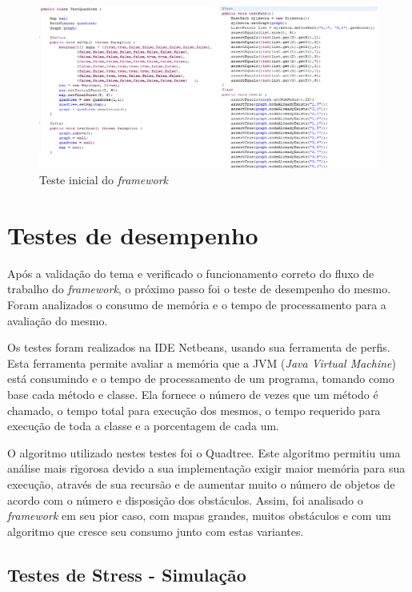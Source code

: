 \begin{figure}[h]
	\centering
	\label{fig35}
		\includegraphics[keepaspectratio=true,scale=0.6]{figuras/testeinicial.png}
	\caption{Teste inicial do \textit{framework}}
\end{figure}

\section{Testes de desempenho}

Após a validação do tema e verificado o funcionamento correto do fluxo de trabalho do \textit{framework}, o próximo passo foi o teste de desempenho do mesmo. Foram analizados o consumo de memória e o tempo de processamento para a avaliação do mesmo. 

Os testes foram realizados na IDE Netbeans, usando sua ferramenta de perfis. Esta ferramenta permite avaliar a memória que a JVM (\textit{Java Virtual Machine}) está consumindo e o tempo de processamento de um programa, tomando como base cada método e classe. Ela fornece o número de vezes que um método é chamado, o tempo total para execução dos mesmos, o tempo requerido para execução de toda a classe e a porcentagem de cada um.

O algoritmo utilizado nestes testes foi o Quadtree. Este algoritmo permitiu uma análise mais rigorosa devido a sua implementação exigir maior memória para sua execução, através de sua recursão e de aumentar muito o número de objetos de acordo com o número e disposição dos obstáculos. Assim, foi analisado o \textit{framework} em seu pior caso, com mapas grandes, muitos obstáculos e com um algoritmo que cresce seu consumo junto com estas variantes.

\subsection{Testes de Stress - Simulação}

